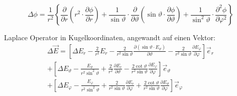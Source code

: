 \begin{description}
            \[
                  \Delta\phi=\frac{1}{r^{2}}\left\{\frac{\partial}{\partial r}\left(r^2\cdot\frac{\partial\phi}{\partial r}\right)
                  +\frac{1}{\sin\vartheta}\cdot\frac{\partial}{\partial\vartheta}\left(\sin\vartheta\cdot\frac{\partial\phi}{\partial\vartheta}\right)
                  +\frac{1}{\sin^{2}\vartheta}\cdot\frac{\partial^{2}\phi}{\partial \varphi^{2}}\right\}
            \]
      \item Laplace Operator in Kugelkoordinaten, angewandt auf einen Vektor:
            \begin{multline*}
                  \Delta \vec{E}  =\left[\Delta E_r-\frac{2}{r^{2}} E_r-\frac{2}{r^{2} \sin \vartheta} \frac{\partial\left(\sin \vartheta \cdot E_\vartheta\right)}{\partial \vartheta}-\frac{2}{r^{2} \sin \vartheta} \frac{\partial E_\varphi}{\partial \varphi}\right] \vec{e}_r        \\
                  +\left[\Delta E_\vartheta-\frac{E_\vartheta}{r^{2} \sin ^{2} \vartheta}+\frac{2}{r^{2}} \frac{\partial E_r}{\partial \vartheta}-\frac{2 \cot \vartheta}{r^{2} \sin \vartheta} \frac{\partial E_\varphi}{\partial \varphi}\right] \vec{e}_\vartheta       \\
                  +\left[\Delta E_\varphi-\frac{E_\varphi}{r^{2} \sin ^{2} \vartheta}+\frac{2}{r^{2} \sin \vartheta} \frac{\partial E_r}{\partial \varphi}+\frac{2 \cot \vartheta}{r^{2} \sin \vartheta} \frac{\partial E_\vartheta}{\partial \varphi}\right] \vec{e}_\varphi
            \end{multline*}
\end{description}
